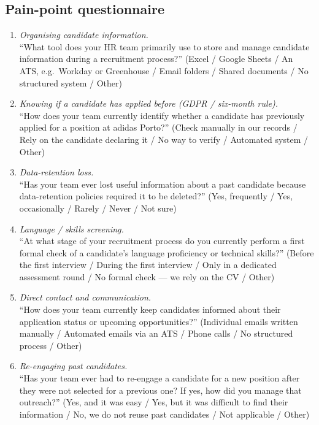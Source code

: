 \subsection*{Pain-point questionnaire}

\begin{enumerate}
	\item \textit{Organising candidate information.}\\
	``What tool does your HR team primarily use to store and manage candidate
	information during a recruitment process?''
	(Excel / Google Sheets / An ATS, e.g.\ Workday or Greenhouse / Email
	folders / Shared documents / No structured system / Other)

	\item \textit{Knowing if a candidate has applied before (GDPR / six-month rule).}\\
	``How does your team currently identify whether a candidate has previously
	applied for a position at adidas Porto?''
	(Check manually in our records / Rely on the candidate declaring it / No
	way to verify / Automated system / Other)

	\item \textit{Data-retention loss.}\\
	``Has your team ever lost useful information about a past candidate because
	data-retention policies required it to be deleted?''
	(Yes, frequently / Yes, occasionally / Rarely / Never / Not sure)

	\item \textit{Language / skills screening.}\\
	``At what stage of your recruitment process do you currently perform a
	first formal check of a candidate's language proficiency or technical
	skills?''
	(Before the first interview / During the first interview / Only in a
	dedicated assessment round / No formal check --- we rely on the CV / Other)

	\item \textit{Direct contact and communication.}\\
	``How does your team currently keep candidates informed about their
	application status or upcoming opportunities?''
	(Individual emails written manually / Automated emails via an ATS / Phone
	calls / No structured process / Other)

	\item \textit{Re-engaging past candidates.}\\
	``Has your team ever had to re-engage a candidate for a new position after
	they were not selected for a previous one? If yes, how did you manage that
	outreach?''
	(Yes, and it was easy / Yes, but it was difficult to find their
	information / No, we do not reuse past candidates / Not applicable / Other)


\end{enumerate}
